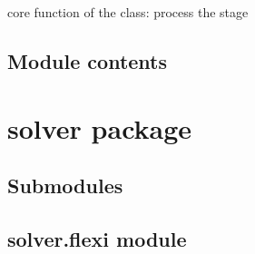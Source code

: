\documentclass[letterpaper,10pt,english]{sphinxmanual}
\begin{document}
\begin{fulllineitems}
\begin{fulllineitems}
\end{fulllineitems}


\begin{fulllineitems}
\label{\detokenize{simulation:simulation.simulation.Stage.process}}
core function of the class: process the stage

\end{fulllineitems}


\begin{fulllineitems}
\label{\detokenize{simulation:simulation.simulation.Stage.unfinished_batches}}
\end{fulllineitems}


\end{fulllineitems}



\section{Module contents}
\label{\detokenize{simulation:module-simulation}}\label{\detokenize{simulation:module-contents}}

\chapter{solver package}
\label{\detokenize{solver:solver-package}}\label{\detokenize{solver::doc}}

\section{Submodules}
\label{\detokenize{solver:submodules}}

\section{solver.flexi module}
\label{\detokenize{solver:module-solver.flexi}}\label{\detokenize{solver:solver-flexi-module}}
\end{document}
